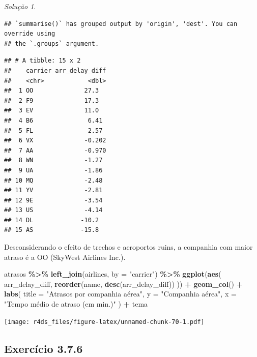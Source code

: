 \documentclass[
]{latex/krantz}
\newenvironment{Shaded}{\begin{snugshade}}{\end{snugshade}}
\newcommand{\AttributeTok}[1]{\textcolor[rgb]{0.13,0.29,0.53}{#1}}
\newcommand{\FunctionTok}[1]{\textcolor[rgb]{0.13,0.29,0.53}{\textbf{#1}}}
\newcommand{\NormalTok}[1]{#1}
\newcommand{\SpecialCharTok}[1]{\textcolor[rgb]{0.81,0.36,0.00}{\textbf{#1}}}
\newcommand{\StringTok}[1]{\textcolor[rgb]{0.31,0.60,0.02}{#1}}
\theoremstyle{definition}
\theoremstyle{definition}
\theoremstyle{definition}
\theoremstyle{definition}
\theoremstyle{remark}
\newtheorem*{solution}{Solução}
\begin{document}
\begin{solution}
\begin{verbatim}
## `summarise()` has grouped output by 'origin', 'dest'. You can override using
## the `.groups` argument.
\end{verbatim}

\begin{verbatim}
## # A tibble: 15 x 2
##    carrier arr_delay_diff
##    <chr>            <dbl>
##  1 OO              27.3  
##  2 F9              17.3  
##  3 EV              11.0  
##  4 B6               6.41 
##  5 FL               2.57 
##  6 VX              -0.202
##  7 AA              -0.970
##  8 WN              -1.27 
##  9 UA              -1.86 
## 10 MQ              -2.48 
## 11 YV              -2.81 
## 12 9E              -3.54 
## 13 US              -4.14 
## 14 DL             -10.2  
## 15 AS             -15.8
\end{verbatim}

Desconsiderando o efeito de trechos e aeroportos ruins, a companhia com maior atraso é a OO (SkyWest Airlines Inc.).

\begin{Shaded}
\begin{Highlighting}[]
\NormalTok{atrasos }\SpecialCharTok{\%\textgreater{}\%}
    \FunctionTok{left\_join}\NormalTok{(airlines, }\AttributeTok{by =} \StringTok{"carrier"}\NormalTok{) }\SpecialCharTok{\%\textgreater{}\%}
    \FunctionTok{ggplot}\NormalTok{(}\FunctionTok{aes}\NormalTok{(}
\NormalTok{        arr\_delay\_diff, }
        \FunctionTok{reorder}\NormalTok{(name, }\FunctionTok{desc}\NormalTok{(arr\_delay\_diff))}
\NormalTok{    )) }\SpecialCharTok{+}
        \FunctionTok{geom\_col}\NormalTok{() }\SpecialCharTok{+}
        \FunctionTok{labs}\NormalTok{(}
            \AttributeTok{title =} \StringTok{"Atrasos por companhia aérea"}\NormalTok{,}
            \AttributeTok{y =} \StringTok{"Companhia aérea"}\NormalTok{,}
            \AttributeTok{x =} \StringTok{"Tempo médio de atraso (em min.)"}
\NormalTok{        ) }\SpecialCharTok{+}
\NormalTok{        tema}
\end{Highlighting}
\end{Shaded}

\texttt{[image: r4ds\_files/figure-latex/unnamed-chunk-70-1.pdf]}
\end{solution}

\hypertarget{exr3-7-6}{%
\subsection*{Exercício 3.7.6}\label{exr3-7-6}}
\end{document}
